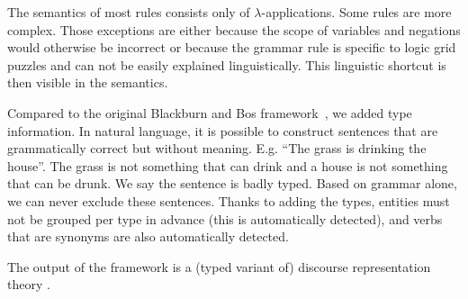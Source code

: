 The semantics of most rules consists only of $\lambda$-applications. Some rules are more complex. Those exceptions are either because the scope of variables and negations would otherwise be incorrect or because the grammar rule is specific to logic grid puzzles and can not be easily explained linguistically. This linguistic shortcut is then visible in the semantics.

Compared to the original Blackburn and Bos framework~\cite{Blackburn2005,Blackburn2006}, we added type information. In natural language, it is possible to construct sentences that are grammatically correct but without meaning. E.g. ``The grass is drinking the house''. The grass is not something that can drink and a house is not something that can be drunk. We say the sentence is badly typed. Based on grammar alone, we can never exclude these sentences. 
Thanks to adding the types, entities must not be grouped per type in advance (this is automatically detected), and verbs that are synonyms are also automatically detected.


The output of the framework is a (typed variant of) discourse representation theory \cite{DRT}.


